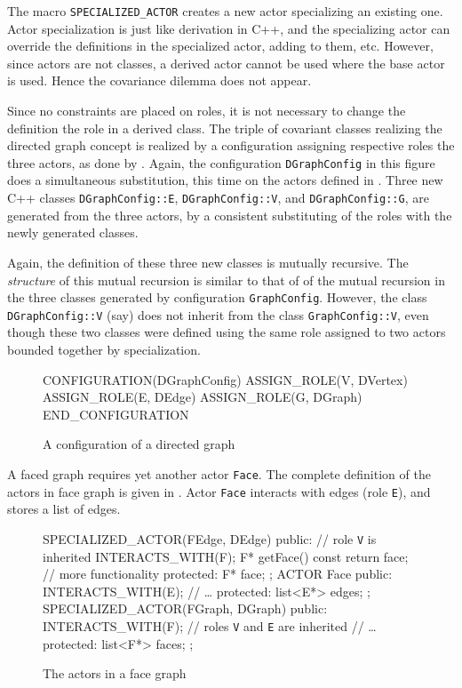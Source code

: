 \documentclass[11pt]{article}
\numberwithin{figure}{section}
\newcommand\CC{\Lang{\mbox{C++}}\xspace}
\newcommand\Lang[1]{\textsc{#1}}
\newcommand{\cd}[1]{\texttt{#1}}
\begin{document}
The macro \cd{SPECIALIZED\_ACTOR} creates
    a new actor specializing an existing one.
Actor specialization is just
    like derivation in \CC, and the specializing
    actor can override the definitions in the specialized
    actor, adding to them, etc.
However, since actors are not classes,
    a derived actor cannot be used where
    the base actor is used.
Hence the covariance dilemma does not appear.

Since no constraints are placed on roles,
    it is not necessary to change the definition
    the role in a derived class.
The triple of covariant classes realizing the directed graph
    concept is realized by a configuration
    assigning respective roles the three actors, as done
    by .
Again, the configuration \cd{DGraphConfig} in this figure
    does a simultaneous substitution, this time on the actors
    defined in .
Three new \CC classes \cd{DGraphConfig::E}, \cd{DGraphConfig::V},
    and \cd{DGraphConfig::G},
    are generated from the three actors, by a consistent substituting of the
    roles with the newly generated classes.

Again, the definition of these three
    new classes is mutually recursive.
The \emph{structure} of this mutual recursion is similar to that
    of of the mutual recursion in the three classes generated
    by configuration \cd{GraphConfig}.
However, the class \cd{DGraphConfig::V}
    (say) does not inherit from the class \cd{GraphConfig::V},
    even though these two classes were defined
    using the same role assigned to two actors bounded
    together by specialization.

\begin{figure}[!htb]
\begin{minipage}[t]{0.5\textwidth}
\CPP
CONFIGURATION(DGraphConfig)
    ASSIGN_ROLE(V, DVertex)
    ASSIGN_ROLE(E, DEdge)
    ASSIGN_ROLE(G, DGraph)
END_CONFIGURATION
\END\PROGg{}%
\end{minipage}%
\caption{A configuration of a directed graph}
\label{Figure:directed:configuration}
\end{figure}

A faced graph requires yet another actor \cd{Face}.
The complete definition of the actors in face graph is
    given in .
Actor \cd{Face} interacts with edges (role \cd{E}),
    and stores a list of edges.

\begin{figure}[!htb]
\CPP
SPECIALIZED_ACTOR(FEdge, DEdge) { public:
    //{} role \cd{V} is inherited
    INTERACTS_WITH(F);
    F* getFace() const { return face; }
    // more functionality
    protected:  F* face;
};
ACTOR Face { public:
    INTERACTS_WITH(E);
    //{} \ldots
    protected: list<E*> edges;
};
SPECIALIZED_ACTOR(FGraph, DGraph) { public:
    INTERACTS_WITH(F);     //{} roles \cd{V} and \cd{E} are inherited
    //{} \ldots
    protected: list<F*> faces;
};
\END\PROGh{}
\caption{The actors in a face graph}
\label{Figure:FGraph}
\end{figure} %
\end{document}
